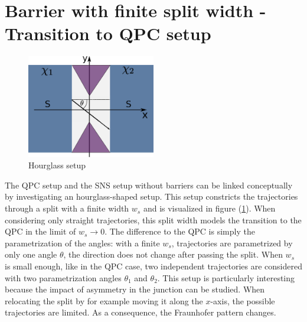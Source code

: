 \section{Barrier with finite split width - Transition to QPC setup}
\begin{figure}
\centering
\includegraphics[width=0.5\textwidth]{figure/analyticalmodel/hourglass}
\caption{Hourglass setup}\label{fig:hourglass}
\end{figure}
The QPC setup and the SNS setup without barriers can be linked conceptually by investigating an hourglass-shaped setup. This setup constricts the trajectories through a split with a finite width $w_s$ and is visualized in figure (\ref{fig:hourglass}). When considering only straight trajectories, this split width models the transition to the QPC in the limit of $w_s \rightarrow 0 $. The difference to the QPC is simply the parametrization of the angles: with a finite $w_s$, trajectories are parametrized by only one angle $\theta$, the direction does not change after passing the split. When $w_s$ is small enough, like in the QPC case, two independent trajectories are considered with two parametrization angles $\theta_1$ and $\theta_2$. 
This setup is particularly interesting because the impact of asymmetry in the junction can be studied. When relocating the split by for example moving it along the $x$-axis, the possible trajectories are limited. As a consequence, the Fraunhofer pattern changes. 


